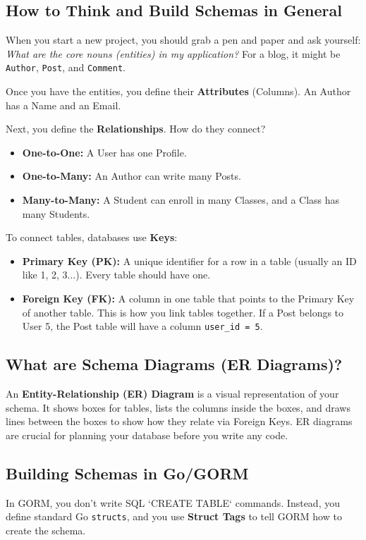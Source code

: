 \documentclass[11pt,a4paper]{article}
\begin{document}
\subsection{How to Think and Build Schemas in General}
When you start a new project, you should grab a pen and paper and ask yourself: \textit{What are the core nouns (entities) in my application?}
For a blog, it might be \texttt{Author}, \texttt{Post}, and \texttt{Comment}. 

Once you have the entities, you define their \textbf{Attributes} (Columns). An Author has a Name and an Email. 

Next, you define the \textbf{Relationships}. How do they connect?
\begin{itemize}
    \item \textbf{One-to-One:} A User has one Profile.
    \item \textbf{One-to-Many:} An Author can write many Posts.
    \item \textbf{Many-to-Many:} A Student can enroll in many Classes, and a Class has many Students.
\end{itemize}

To connect tables, databases use \textbf{Keys}:
\begin{itemize}
    \item \textbf{Primary Key (PK):} A unique identifier for a row in a table (usually an ID like 1, 2, 3...). Every table should have one.
    \item \textbf{Foreign Key (FK):} A column in one table that points to the Primary Key of another table. This is how you link tables together. If a Post belongs to User 5, the Post table will have a column \texttt{user\_id = 5}.
\end{itemize}

\subsection{What are Schema Diagrams (ER Diagrams)?}
An \textbf{Entity-Relationship (ER) Diagram} is a visual representation of your schema. It shows boxes for tables, lists the columns inside the boxes, and draws lines between the boxes to show how they relate via Foreign Keys. ER diagrams are crucial for planning your database before you write any code.

\subsection{Building Schemas in Go/GORM}
In GORM, you don't write SQL `CREATE TABLE` commands. Instead, you define standard Go \texttt{structs}, and you use \textbf{Struct Tags} to tell GORM how to create the schema.
\end{document}

